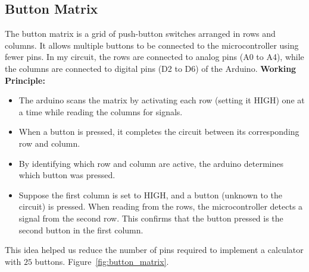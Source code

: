 \documentclass[a4paper,12pt]{article}
\begin{document}
\subsection*{Button Matrix}
The button matrix is a grid of push-button switches arranged in rows and columns. It allows multiple buttons to be connected to the microcontroller using fewer pins. In my circuit, the rows are connected to analog pins (A0 to A4), while the columns are connected to digital pins (D2 to D6) of the Arduino.\newline
\textbf{Working Principle:}
\begin{itemize}
    \item The arduino scans the matrix by activating each row (setting it HIGH) one at a time while reading the columns for signals.
    \item When a button is pressed, it completes the circuit between its corresponding row and column.
    \item By identifying which row and column are active, the arduino determines which button was pressed.
    \item Suppose the first column is set to \( \text{HIGH} \), and a button (unknown to the circuit) is pressed. When reading from the rows, the microcontroller detects a signal from the second row. This confirms that the button pressed is the second button in the first column.
\end{itemize}
This idea helped us reduce the number of pins required to implement a calculator with $25$ buttons.
Figure~\ref{fig:button_matrix}.
\end{document}
